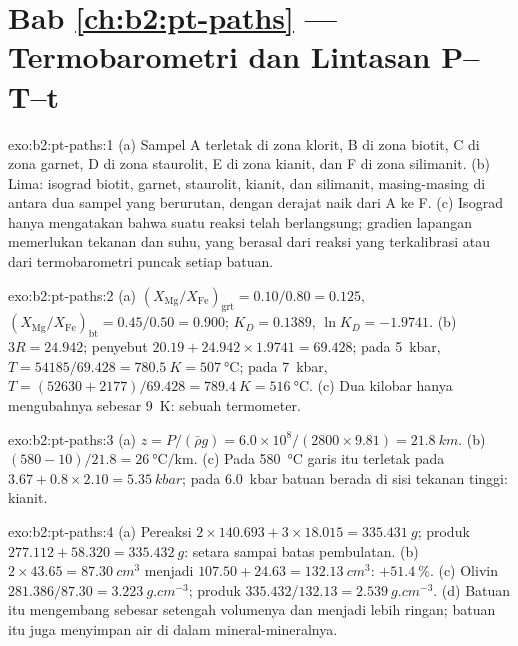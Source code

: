 \section*{Bab \ref{ch:b2:pt-paths} --- Termobarometri dan Lintasan P--T--t}

\begin{solution}{exo:b2:pt-paths:1}
(a) Sampel A terletak di zona klorit, B di zona biotit, C di zona garnet, D di zona staurolit, E di zona kianit,
dan F di zona silimanit. (b) Lima: isograd biotit, garnet, staurolit, kianit, dan silimanit,
masing-masing di antara dua sampel yang berurutan, dengan derajat naik dari A ke F. (c) Isograd
hanya mengatakan bahwa suatu reaksi telah berlangsung; gradien lapangan memerlukan tekanan dan suhu, yang
berasal dari reaksi yang terkalibrasi atau dari termobarometri  puncak setiap
batuan.
\end{solution}

\begin{solution}{exo:b2:pt-paths:2}
(a) $(X_{\text{Mg}}/X_{\text{Fe}})_{\text{grt}} = 0.10/0.80 = 0.125$,
$(X_{\text{Mg}}/X_{\text{Fe}})_{\text{bt}} = 0.45/0.50 = 0.900$; $K_D = 0.1389$, $\ln K_D =
-1.9741$. (b) $3R = 24.942$; penyebut $20.19 + 24.942\times1.9741 = 69.428$; pada
\qty{5}{kbar}, $T = 54185/69.428 = \qty{780.5}{K} = \qty{507}{\celsius}$; pada
\qty{7}{kbar}, $T = (52630 + 2177)/69.428 = \qty{789.4}{K} = \qty{516}{\celsius}$.
(c) Dua kilobar hanya mengubahnya sebesar \qty{9}{K}: sebuah termometer.
\end{solution}

\begin{solution}{exo:b2:pt-paths:3}
(a) $z = P/(\bar\rho g) = 6.0\times10^8/(2800\times9.81) = \qty{21.8}{km}$.
(b) $(580 - 10)/21.8 = \qty{26}{\celsius\per\km}$. (c) Pada \qty{580}{\celsius} garis itu
terletak pada $3.67 + 0.8\times2.10 = \qty{5.35}{kbar}$; pada \qty{6.0}{kbar} batuan berada di
sisi tekanan tinggi: kianit.
\end{solution}

\begin{solution}{exo:b2:pt-paths:4}
(a) Pereaksi $2\times140.693 + 3\times18.015 = \qty{335.431}{g}$; produk $277.112 +
58.320 = \qty{335.432}{g}$: setara sampai batas pembulatan. (b) $2\times43.65 =
\qty{87.30}{cm^3}$ menjadi $107.50 + 24.63 = \qty{132.13}{cm^3}$: $+\qty{51.4}{\percent}$.
(c) Olivin $281.386/87.30 = \qty{3.223}{g.cm^{-3}}$; produk $335.432/132.13 =
\qty{2.539}{g.cm^{-3}}$. (d) Batuan itu mengembang sebesar setengah volumenya dan menjadi lebih ringan; batuan itu
juga menyimpan air di dalam mineral-mineralnya.
\end{solution}

